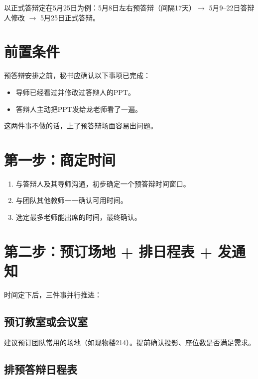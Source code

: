 \documentclass[12pt,a4paper,openany]{ctexbook}
\begin{document}
\begin{tipbox}
以正式答辩定在5月25日为例：5月8日左右预答辩（间隔17天）$\rightarrow$ 5月9--22日答辩人修改 $\rightarrow$ 5月25日正式答辩。
\end{tipbox}

\section{前置条件}

预答辩安排之前，秘书应确认以下事项已完成：

\begin{itemize}
  \item 导师已经看过并修改过答辩人的PPT。
  \item 答辩人主动把PPT发给龙老师看了一遍。
\end{itemize}

\begin{warnbox}
这两件事不做的话，上了预答辩场面容易出问题。
\end{warnbox}

\section{第一步：商定时间}

\begin{enumerate}
  \item 与答辩人及其导师沟通，初步确定一个预答辩时间窗口。
  \item 与团队其他教师一一确认可用时间。
  \item 选定最多老师能出席的时间，最终确认。
\end{enumerate}

\section{第二步：预订场地 + 排日程表 + 发通知}

时间定下后，三件事并行推进：

\subsection{预订教室或会议室}

建议预订团队常用的场地（如现物楼214）。提前确认投影、座位数是否满足需求。

\subsection{排预答辩日程表}
\end{document}
